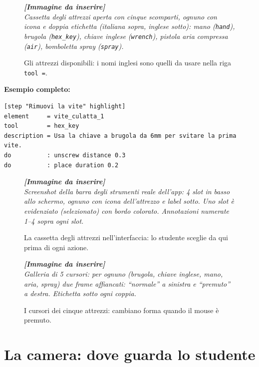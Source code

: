 ﻿\documentclass[a4paper,12pt,oneside]{book}
\newcommand{\kw}[1]{\texttt{\color{keycolor}#1}}
\newcommand{\imgph}[2]{%
  \begin{tcolorbox}[colback=cvtlightblue!30,colframe=cvtblue!40,%
    width=#1,halign=center,valign=center,height=5cm,boxrule=0.5pt,arc=3pt]%
    \textcolor{cvtgray}{\itshape\footnotesize\textbf{[Immagine da inserire]}\\[3pt]#2}%
  \end{tcolorbox}}
\begin{document}
\begin{figure}[H]
  \centering
  \imgph{12cm}{Cassetta degli attrezzi aperta con cinque scomparti, ognuno con icona e doppia etichetta (italiana sopra, inglese sotto): mano (\texttt{hand}), brugola (\texttt{hex\_key}), chiave inglese (\texttt{wrench}), pistola aria compressa (\texttt{air}), bomboletta spray (\texttt{spray}).}
  \caption{Gli attrezzi disponibili: i nomi inglesi sono quelli da usare nella riga \kw{tool =}.}
  \label{fig:cinque-attrezzi}
\end{figure}

\textbf{Esempio completo:}

\begin{lstlisting}
[step "Rimuovi la vite" highlight]
element     = vite_culatta_1
tool        = hex_key
description = Usa la chiave a brugola da 6mm per svitare la prima vite.
do          : unscrew distance 0.3
do          : place duration 0.2
\end{lstlisting}

\begin{figure}[H]
  \centering
  \imgph{12cm}{Screenshot della barra degli strumenti reale dell'app: 4 slot in basso allo schermo, ognuno con icona dell'attrezzo e label sotto. Uno slot è evidenziato (selezionato) con bordo colorato. Annotazioni numerate 1--4 sopra ogni slot.}
  \caption{La cassetta degli attrezzi nell'interfaccia: lo studente sceglie da qui prima di ogni azione.}
  \label{fig:barra-strumenti-app}
\end{figure}

\begin{figure}[H]
  \centering
  \imgph{12cm}{Galleria di 5 cursori: per ognuno (brugola, chiave inglese, mano, aria, spray) due frame affiancati: ``normale'' a sinistra e ``premuto'' a destra. Etichetta sotto ogni coppia.}
  \caption{I cursori dei cinque attrezzi: cambiano forma quando il mouse è premuto.}
  \label{fig:galleria-cursori}
\end{figure}

\chapter{La camera: dove guarda lo studente}
\label{ch:camera}
\end{document}
